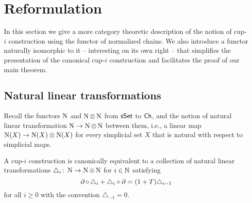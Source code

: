 
\section{Reformulation} \label{s:reformulation}

In this section we give a more category theoretic description of the notion of \mbox{cup-$i$} construction using the functor of normalized chains.
We also introduce a functor naturally isomorphic to it -- interesting on its own right -- that simplifies the presentation of the canonical cup-$i$ construction and facilitates the proof of our main theorem.

\subsection{Natural linear transformations}

Recall the functors $\operatorname{N}$ and $\operatorname{N} \otimes \operatorname{N}$ from $\mathsf{sSet}$ to $\mathsf{Ch}$, and the notion of natural linear transformation $\operatorname{N} \to \operatorname{N} \otimes \operatorname{N}$ between them, i.e., a linear map $\operatorname{N}(X) \to \operatorname{N}(X) \otimes \operatorname{N}(X)$ for every simplicial set $X$ that is natural with respect to simplicial maps.

\begin{lemma} \label{l:coalgebra}
	A \mbox{cup-$i$} construction is canonically equivalent to a collection of natural linear transformations $\triangle_i \colon \operatorname{N} \to \operatorname{N} \otimes \operatorname{N}$ for $i \in \mathbb{N}$ satisfying
	\[
	\operatorname{\partial} \circ \, \triangle_i + \triangle_i \circ \operatorname{\partial} =
	(1+T) \triangle_{i-1}
	\]
	for all $i \geq 0$ with the convention $\triangle_{-1} = 0$.
\end{lemma}

